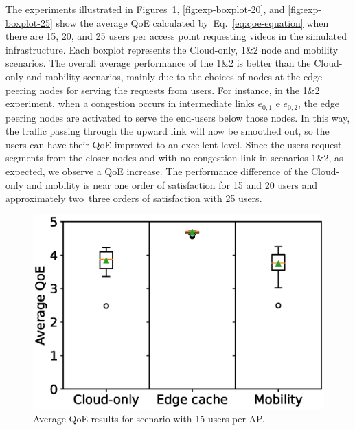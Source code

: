 The experiments illustrated in Figures~\ref{fig:exp-boxplot-15}, \ref{fig:exp-boxplot-20}, and \ref{fig:exp-boxplot-25} show the average QoE calculated by~Eq.~\ref{eq:qoe-equation} when there are 15, 20, and 25 users per access point requesting videos in the simulated infrastructure. Each boxplot represents the Cloud-only, 1\&2 node and mobility scenarios. The overall average performance of the 1\&2 is better than the Cloud-only and mobility scenarios, mainly due to the choices of nodes at the edge peering nodes for serving the requests from users. 
%
For instance, in the 1\&2 experiment, when a congestion occurs in intermediate links $e_{0,1}$ e $e_{0,2}$, the edge peering nodes are activated to serve the end-users below those nodes. In this way, the traffic passing through the upward link  will now be smoothed out, so the users can have their QoE improved to an excellent level.
%
Since the users request segments from the closer nodes and with no congestion link in scenarios 1\&2, as expected, we observe a QoE increase. %
%
The performance difference of the Cloud-only and mobility is near one order of satisfaction for 15 and 20 users and approximately two~three orders of satisfaction with 25 users.


\begin{figure}[!h]
    \centering
    \includegraphics[width=\linewidth]{images/QoEBoxplot-15u-2.eps}
    \vspace{-0.6cm}
    \caption{Average QoE results for scenario with 15 users per AP.}
    \label{fig:exp-boxplot-15}
\end{figure}

